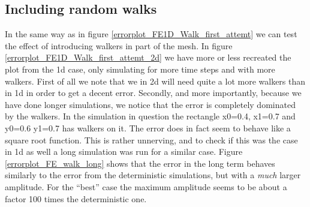 \subsection{Including random walks}

In the same way as in figure \ref{errorplot_FE1D_Walk_first_attemt} we can test the effect of introducing walkers in part of the mesh. 
In figure \ref{errorplot_FE1D_Walk_first_attemt_2d} we have more or less recreated the plot from the 1d case, only simulating for more time steps and with more walkers. 
First of all we note that we in 2d will need quite a lot more walkers than in 1d in order to get a decent error. 
Secondly, and more importantly, because we have done longer simulations, we notice that the error is completely dominated by the walkers. 
In the simulation in question the rectangle x0=0.4, x1=0.7 and y0=0.6 y1=0.7 has walkers on it.
The error does in fact seem to behave like a square root function. 
This is rather unnerving, and to check if this was the case in 1d as well a long simulation was run for a similar case. 
Figure \ref{errorplot_FE_walk_long} shows that the error in the long term behaves similarly to the error from the deterministic simulations, but with a \emph{much} larger amplitude. For the ``best'' case the maximum amplitude seems to be about a factor 100 times the deterministic one.

